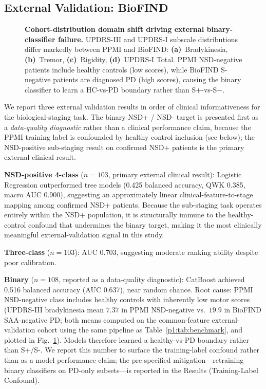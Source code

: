 \documentclass[10pt,letterpaper]{article}
\begin{document}
\subsection*{External Validation: BioFIND}

\begin{figure}[!t]

\caption{\textbf{Cohort-distribution domain shift driving external binary-classifier failure.} UPDRS-III and UPDRS-I subscale distributions differ markedly between PPMI and BioFIND: \textbf{(a)}~Bradykinesia, \textbf{(b)}~Tremor, \textbf{(c)}~Rigidity, \textbf{(d)}~UPDRS-I Total. PPMI NSD-negative patients include healthy controls (low scores), while BioFIND S-negative patients are diagnosed PD (high scores), causing the binary classifier to learn a HC-vs-PD boundary rather than S$+$-vs-S$-$.}
\label{p1:fig:domainshift}
\end{figure}

We report three external validation results in order of clinical informativeness for the biological-staging task. The binary NSD+ / NSD- target is presented first as a \emph{data-quality diagnostic} rather than a clinical performance claim, because the PPMI training label is confounded by healthy control inclusion (see below); the NSD-positive sub-staging result on confirmed NSD+ patients is the primary external clinical result.

\textbf{NSD-positive 4-class} ($n{=}103$, primary external clinical result): Logistic Regression outperformed tree models (0.425 balanced accuracy, QWK 0.385, macro AUC 0.900), suggesting an approximately linear clinical-feature-to-stage mapping among confirmed NSD+ patients. Because the sub-staging task operates entirely within the NSD+ population, it is structurally immune to the healthy-control confound that undermines the binary target, making it the most clinically meaningful external-validation signal in this study.

\textbf{Three-class} ($n{=}103$): AUC 0.703, suggesting moderate ranking ability despite poor calibration.

\textbf{Binary} ($n{=}108$, reported as a data-quality diagnostic): CatBoost achieved 0.516 balanced accuracy (AUC 0.637), near random chance. Root cause: PPMI NSD-negative class includes healthy controls with inherently low motor scores (UPDRS-III bradykinesia mean $7.37$ in PPMI NSD-negative vs.\ $19.9$ in BioFIND SAA-negative PD; both means computed on the common-feature external-validation cohort using the same pipeline as Table~\ref{p1:tab:benchmark}, and plotted in Fig.~\ref{p1:fig:domainshift}). Models therefore learned a healthy-vs-PD boundary rather than S+/S-. We report this number to surface the training-label confound rather than as a model performance claim; the pre-specified mitigation---retraining binary classifiers on PD-only subsets---is reported in the Results (Training-Label Confound).
\end{document}
